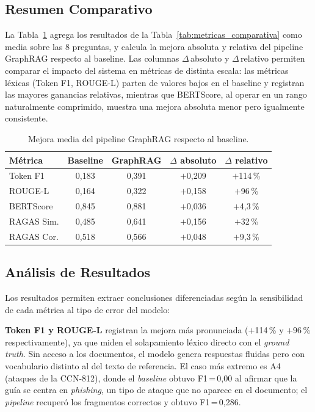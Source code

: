 \subsection{Resumen Comparativo}

La Tabla~\ref{tab:resumen_metricas} agrega los resultados de la Tabla~\ref{tab:metricas_comparativa} como media sobre las 8 preguntas, y calcula la mejora absoluta y relativa del pipeline GraphRAG respecto al baseline. Las columnas $\Delta$\,absoluto y $\Delta$\,relativo permiten comparar el impacto del sistema en métricas de distinta escala: las métricas léxicas (Token F1, ROUGE-L) parten de valores bajos en el baseline y registran las mayores ganancias relativas, mientras que BERTScore, al operar en un rango naturalmente comprimido, muestra una mejora absoluta menor pero igualmente consistente.

\begin{table}[ht]
\centering
\renewcommand{\arraystretch}{1.3}
\caption{Mejora media del pipeline GraphRAG respecto al baseline.}
\label{tab:resumen_metricas}
\begin{tabular}{|l|c|c|c|c|}
\hline
\textbf{Métrica} & \textbf{Baseline} & \textbf{GraphRAG} & \textbf{$\Delta$ absoluto} & \textbf{$\Delta$ relativo} \\ \hline
Token F1    & 0{,}183 & 0{,}391 & $+$0{,}209 & $+$114\,\% \\ \hline
ROUGE-L     & 0{,}164 & 0{,}322 & $+$0{,}158 & $+$96\,\%  \\ \hline
BERTScore   & 0{,}845 & 0{,}881 & $+$0{,}036 & $+$4{,}3\,\% \\ \hline
RAGAS Sim.  & 0{,}485 & 0{,}641 & $+$0{,}156 & $+$32\,\%  \\ \hline
RAGAS Cor.  & 0{,}518 & 0{,}566 & $+$0{,}048 & $+$9{,}3\,\% \\ \hline
\end{tabular}
\end{table}

\subsection{Análisis de Resultados}

Los resultados permiten extraer conclusiones diferenciadas según la sensibilidad de cada métrica al tipo de error del modelo:

\textbf{Token F1 y ROUGE-L} registran la mejora más pronunciada ($+$114\,\% y $+$96\,\% respectivamente), ya que miden el solapamiento léxico directo con el \textit{ground truth}. Sin acceso a los documentos, el modelo genera respuestas fluidas pero con vocabulario distinto al del texto de referencia. El caso más extremo es A4 (ataques de la CCN-812), donde el \textit{baseline} obtuvo F1\,=\,0{,}00 al afirmar que la guía se centra en \textit{phishing}, un tipo de ataque que no aparece en el documento; el \textit{pipeline} recuperó los fragmentos correctos y obtuvo F1\,=\,0{,}286.

